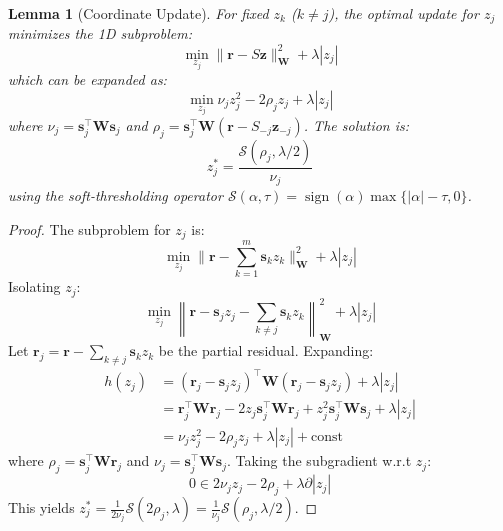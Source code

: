 \documentclass[12pt,a4paper]{article}
\theoremstyle{plain}
\newtheorem{lemma}[theorem]{Lemma}
\theoremstyle{definition}
\theoremstyle{remark}
\DeclareMathOperator{\sign}{sign}
\begin{document}
\begin{lemma}[Coordinate Update]\label{lem:coord_update}
	For fixed $z_k$ ($k \neq j$), the optimal update for $z_j$ minimizes the 1D subproblem:
	\begin{equation}
		\min_{z_j} \|\mathbf{r} - S\mathbf{z}\|_{\mathbf{W}}^2 + \lambda |z_j|
	\end{equation}
	which can be expanded as:
	\begin{equation}
		\min_{z_j} \nu_j z_j^2 - 2 \rho_j z_j + \lambda |z_j|
	\end{equation}
	where $\nu_j = \mathbf{s}_j^\top \mathbf{W} \mathbf{s}_j$ and $\rho_j = \mathbf{s}_j^\top \mathbf{W} (\mathbf{r} - S_{-j}\mathbf{z}_{-j})$. The solution is:
	\begin{equation}
		z_j^* = \frac{\mathcal{S}(\rho_j, \lambda/2)}{\nu_j}
	\end{equation}
	using the soft-thresholding operator $\mathcal{S}(\alpha, \tau) = \sign(\alpha)\max\{|\alpha|-\tau, 0\}$.
\end{lemma}

\begin{proof}
	The subproblem for $z_j$ is:
	\begin{equation}
		\min_{z_j} \|\mathbf{r} - \sum_{k=1}^m \mathbf{s}_k z_k\|_{\mathbf{W}}^2 + \lambda |z_j|
	\end{equation}
	Isolating $z_j$:
	\begin{equation}
		\min_{z_j} \left\|\mathbf{r} - \mathbf{s}_j z_j - \sum_{k \neq j} \mathbf{s}_k z_k\right\|_{\mathbf{W}}^2 + \lambda |z_j|
	\end{equation}
	Let $\mathbf{r}_j = \mathbf{r} - \sum_{k \neq j} \mathbf{s}_k z_k$ be the partial residual. Expanding:
	\begin{align}
		h(z_j) & = (\mathbf{r}_j - \mathbf{s}_j z_j)^\top \mathbf{W} (\mathbf{r}_j - \mathbf{s}_j z_j) + \lambda |z_j|                                                           \\
		       & = \mathbf{r}_j^\top \mathbf{W} \mathbf{r}_j - 2 z_j \mathbf{s}_j^\top \mathbf{W} \mathbf{r}_j + z_j^2 \mathbf{s}_j^\top \mathbf{W} \mathbf{s}_j + \lambda |z_j| \\
		       & = \nu_j z_j^2 - 2 \rho_j z_j + \lambda |z_j| + \text{const}
	\end{align}
	where $\rho_j = \mathbf{s}_j^\top \mathbf{W} \mathbf{r}_j$ and $\nu_j = \mathbf{s}_j^\top \mathbf{W} \mathbf{s}_j$. Taking the subgradient w.r.t $z_j$:
	\begin{equation}
		0 \in 2\nu_j z_j - 2\rho_j + \lambda \partial |z_j|
	\end{equation}
	This yields $z_j^* = \frac{1}{2\nu_j} \mathcal{S}(2\rho_j, \lambda) = \frac{1}{\nu_j} \mathcal{S}(\rho_j, \lambda/2)$.
\end{proof}
\end{document}
